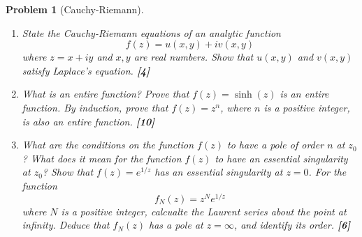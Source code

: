 \documentclass[a4paper]{article}
\theoremstyle{new}
\newtheorem{qns}{Problem}[section]
\begin{document}
\newpage
\begin{qns}[Cauchy-Riemann]\leavevmode
\begin{enumerate}[label=(\alph*)]
\item State the Cauchy-Riemann equations of an analytic function $$f(z)=u(x,y)+iv(x,y)$$ where $z=x+iy$ and $x,y$ are real numbers. Show that $u(x,y)$ and $v(x,y)$ satisfy Laplace's equation. \hfill \textbf{[4]}
\item What is an entire function? Prove that $f(z)=\sinh(z)$ is an entire function. By induction, prove that $f(z)=z^n$, where $n$ is a positive integer, is also an entire function. \hfill \textbf{[10]}
\item What are the conditions on the function $f(z)$ to have a pole of order $n$ at $z_0$? What does it mean for the function $f(z)$ to have an essential singularity at $z_0$? Show that $f(z)=e^{1/z}$ has an essential singularity at $z=0$. For the function $$f_N(z)=z^Ne^{1/z}$$ where $N$ is a positive integer, calcualte the Laurent series about the point at infinity. Deduce that $f_N(z)$ has a pole at $z=\infty$, and identify its order. \hfill \textbf{[6]}
\end{enumerate}
\end{qns}
\end{document}
